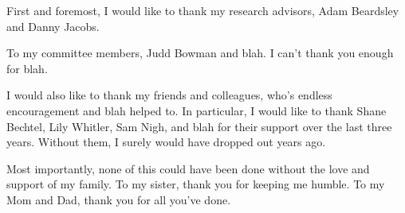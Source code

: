 First and foremost, I would like to thank my research advisors, Adam Beardsley
and Danny Jacobs.

To my committee members, Judd Bowman and blah. I can't thank you enough for blah.

I would also like to thank my friends and colleagues, who's endless encouragement
and blah helped to. In particular, I would like to thank Shane Bechtel, Lily Whitler,
Sam Nigh, and blah for their support over the last three years. Without them, I
surely would have dropped out years ago.

Most importantly, none of this could have been done without the love and support
of my family. To my sister, thank you for keeping me humble. To my Mom and Dad,
thank you for all you've done.

\clearpage
